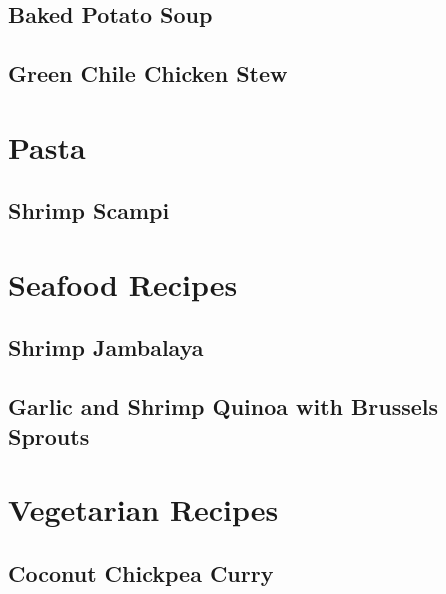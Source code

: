 \documentclass{report}
\begin{document}
\section{Baked Potato Soup}

\newpage 


\section{Green Chile Chicken Stew}


\chapter{Pasta}
\newpage

\section{Shrimp Scampi}


\chapter{Seafood Recipes}
\newpage

\section{Shrimp Jambalaya}

\newpage


\section{Garlic and Shrimp Quinoa with Brussels Sprouts}


\chapter{Vegetarian Recipes}
\newpage 
\section{Coconut Chickpea Curry}

\newpage 
%
\end{document}
